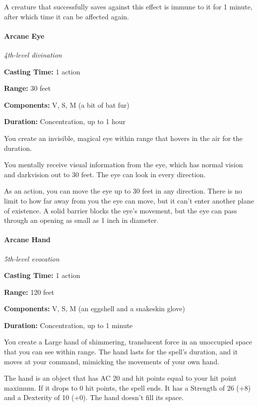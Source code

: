 \documentclass[
]{article}
\begin{document}
A creature that successfully saves against this effect is immune to it
for 1 minute, after which time it can be affected again.

\hypertarget{arcane-eye}{%
\paragraph{Arcane Eye}\label{arcane-eye}}

\emph{4th-level divination}

\textbf{Casting Time:} 1 action

\textbf{Range:} 30 feet

\textbf{Components:} V, S, M (a bit of bat fur)

\textbf{Duration:} Concentration, up to 1 hour

You create an invisible, magical eye within range that hovers in the air
for the duration.

You mentally receive visual information from the eye, which has normal
vision and darkvision out to 30 feet. The eye can look in every
direction.

As an action, you can move the eye up to 30 feet in any direction. There
is no limit to how far away from you the eye can move, but it can't
enter another plane of existence. A solid barrier blocks the eye's
movement, but the eye can pass through an opening as small as 1 inch in
diameter.

\hypertarget{arcane-hand}{%
\paragraph{Arcane Hand}\label{arcane-hand}}

\emph{5th-level evocation}

\textbf{Casting Time:} 1 action

\textbf{Range:} 120 feet

\textbf{Components:} V, S, M (an eggshell and a snakeskin glove)

\textbf{Duration:} Concentration, up to 1 minute

You create a Large hand of shimmering, translucent force in an
unoccupied space that you can see within range. The hand lasts for the
spell's duration, and it moves at your command, mimicking the movements
of your own hand.

The hand is an object that has AC 20 and hit points equal to your hit
point maximum. If it drops to 0 hit points, the spell ends. It has a
Strength of 26 (+8) and a Dexterity of 10 (+0). The hand doesn't fill
its space.
\end{document}

